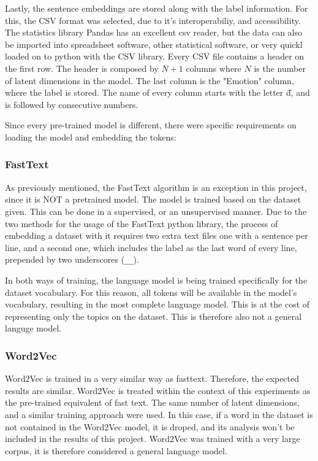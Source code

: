 Lastly, the sentence embeddings are stored along with the label information. For this, the CSV format was selected, due to it's interoperabiliy, and accessibility. The statistics library Pandas has an excellent csv reader, but the data can also be imported into spreadsheet software, other statistical software, or very quickl loaded on to python with the CSV library. Every CSV file contains a header on the first row. The header is composed by $N+1$ columns where $N$ is the number of latent dimensions in the model. The last column is the "Emotion" column, where the label is stored. The name of every column starts with the letter \"d\", and is followed by consecutive numbers.

Since every pre-trained model is different, there were specific requirements on loading the model and embedding the tokens:

\subsubsection{FastText}\label{subs:FastText}
As previously mentioned, the FastText algorithm is an exception in this project, since it is NOT a pretrained model. The model is trained based on the dataset given. This can be done in a supervised, or an unsupervised manner. Due to the two methods for the usage of the FastText python library, the process of embedding a dataset with it requires two extra text files one with a sentence per line, and a second one, which includes the label as the last word of every line, prepended by two underscores (\lstinline{__}).

In both ways of training, the language model is being trained specifically for the dataset vocabulary. For this reason, all tokens will be available in the model's vocabulary, resulting in the most complete language model. This is at the cost of representing only the topics on the dataset. This is therefore also not a general languge model.

\subsubsection{Word2Vec}\label{subs:Word2Vec}
Word2Vec is trained in a very similar way as fasttext. Therefore, the expected results are similar. Word2Vec is treated within the context of this experiments as the pre-trained equivalent of fast text. The same number of latent dimensions, and a similar training approach were used. In this case, if a word in the dataset is not contained in the Word2Vec model, it is droped, and its analysis won't be included in the results of this project. Word2Vec was trained with a very large corpus, it is therefore considered a general language model.

